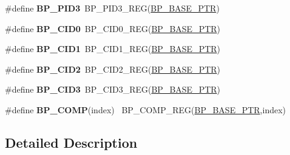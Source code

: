\begin{DoxyCompactItemize}
\item 
\hypertarget{group___b_p___register___accessor___macros_ga0a00491adb1eb94a135e34890caf06d9}{}\#define {\bfseries B\+P\+\_\+\+P\+I\+D3}~B\+P\+\_\+\+P\+I\+D3\+\_\+\+R\+E\+G(\hyperlink{group___b_p___peripheral_ga375cd6d2e7ec414f4e33cb54d5494940}{B\+P\+\_\+\+B\+A\+S\+E\+\_\+\+P\+T\+R})\label{group___b_p___register___accessor___macros_ga0a00491adb1eb94a135e34890caf06d9}

\item 
\hypertarget{group___b_p___register___accessor___macros_gac554c0442a617d13f84c95af8faf9a11}{}\#define {\bfseries B\+P\+\_\+\+C\+I\+D0}~B\+P\+\_\+\+C\+I\+D0\+\_\+\+R\+E\+G(\hyperlink{group___b_p___peripheral_ga375cd6d2e7ec414f4e33cb54d5494940}{B\+P\+\_\+\+B\+A\+S\+E\+\_\+\+P\+T\+R})\label{group___b_p___register___accessor___macros_gac554c0442a617d13f84c95af8faf9a11}

\item 
\hypertarget{group___b_p___register___accessor___macros_ga25e9b4026009629d703d5463baa85695}{}\#define {\bfseries B\+P\+\_\+\+C\+I\+D1}~B\+P\+\_\+\+C\+I\+D1\+\_\+\+R\+E\+G(\hyperlink{group___b_p___peripheral_ga375cd6d2e7ec414f4e33cb54d5494940}{B\+P\+\_\+\+B\+A\+S\+E\+\_\+\+P\+T\+R})\label{group___b_p___register___accessor___macros_ga25e9b4026009629d703d5463baa85695}

\item 
\hypertarget{group___b_p___register___accessor___macros_gabe4f49fd630b67a0ba0e58b37fb78c58}{}\#define {\bfseries B\+P\+\_\+\+C\+I\+D2}~B\+P\+\_\+\+C\+I\+D2\+\_\+\+R\+E\+G(\hyperlink{group___b_p___peripheral_ga375cd6d2e7ec414f4e33cb54d5494940}{B\+P\+\_\+\+B\+A\+S\+E\+\_\+\+P\+T\+R})\label{group___b_p___register___accessor___macros_gabe4f49fd630b67a0ba0e58b37fb78c58}

\item 
\hypertarget{group___b_p___register___accessor___macros_gaa9964a6a353ac63f76306563fda7b188}{}\#define {\bfseries B\+P\+\_\+\+C\+I\+D3}~B\+P\+\_\+\+C\+I\+D3\+\_\+\+R\+E\+G(\hyperlink{group___b_p___peripheral_ga375cd6d2e7ec414f4e33cb54d5494940}{B\+P\+\_\+\+B\+A\+S\+E\+\_\+\+P\+T\+R})\label{group___b_p___register___accessor___macros_gaa9964a6a353ac63f76306563fda7b188}

\item 
\hypertarget{group___b_p___register___accessor___macros_ga3fe8478642c163af7fcf732b96227f76}{}\#define {\bfseries B\+P\+\_\+\+C\+O\+M\+P}(index)                                                  ~B\+P\+\_\+\+C\+O\+M\+P\+\_\+\+R\+E\+G(\hyperlink{group___b_p___peripheral_ga375cd6d2e7ec414f4e33cb54d5494940}{B\+P\+\_\+\+B\+A\+S\+E\+\_\+\+P\+T\+R},index)\label{group___b_p___register___accessor___macros_ga3fe8478642c163af7fcf732b96227f76}

\end{DoxyCompactItemize}


\subsection{Detailed Description}
